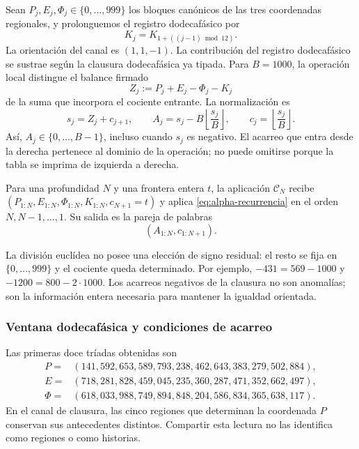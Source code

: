 Sean \(P_j,E_j,\Phi_j\in\{0,\ldots,999\}\) los bloques canónicos de
las tres coordenadas regionales, y prolonguemos el registro dodecafásico por
\[
 K_j=K_{1+((j-1)\bmod12)}.
\]
La orientación del canal es \((1,1,-1)\). La contribución del registro dodecafásico se
sustrae según la clausura dodecafásica ya tipada. Para \(B=1000\), la
operación local distingue el balance firmado
\[
 Z_j:=P_j+E_j-\Phi_j-K_j
\]
de la suma que incorpora el cociente entrante. La normalización es
\begin{equation}
 s_j=Z_j+c_{j+1},\qquad
 A_j=s_j-B\left\lfloor\frac{s_j}{B}\right\rfloor,
 \qquad c_j=\left\lfloor\frac{s_j}{B}\right\rfloor.
 \label{eq:alpha-recurrencia}
\end{equation}
Así, \(A_j\in\{0,\ldots,B-1\}\), incluso cuando \(s_j\) es
negativo. El acarreo que entra desde la derecha pertenece al dominio de
la operación; no puede omitirse porque la tabla se imprima de izquierda
a derecha.

\begin{definition}
\label{def:alpha-finita}
Para una profundidad \(N\) y una frontera entera \(t\), la aplicación
\(\mathcal C_N\) recibe
\((P_{1:N},E_{1:N},\Phi_{1:N},K_{1:N},c_{N+1}=t)\) y aplica
\eqref{eq:alpha-recurrencia} en el orden \(N,N-1,\ldots,1\). Su salida
es la pareja de palabras
\[
 (A_{1:N},c_{1:N+1}).
\]
\end{definition}

La división euclídea no posee una elección de signo residual: el resto se
fija en \(\{0,\ldots,999\}\) y el cociente queda determinado. Por
ejemplo, \(-431=569-1000\) y \(-1200=800-2\cdot1000\). Los
acarreos negativos de la clausura no son anomalías; son la información
entera necesaria para mantener la igualdad orientada.

\subsubsection{Ventana dodecafásica y condiciones de acarreo}
\label{subsec:alpha-ventana}

Las primeras doce tríadas obtenidas son
\begin{align*}
 P={}&(141,592,653,589,793,238,462,643,383,279,502,884),\\
 E={}&(718,281,828,459,045,235,360,287,471,352,662,497),\\
 \Phi={}&(618,033,988,749,894,848,204,586,834,365,638,117).
\end{align*}
En el canal de clausura, las cinco regiones que determinan la coordenada
\(P\) conservan sus antecedentes distintos. Compartir esta lectura no
las identifica como regiones o como historias.

